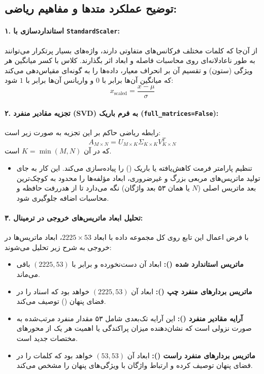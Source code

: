 \documentclass{article}
\begin{document}
    \subsection*{توضیح عملکرد متدها و مفاهیم ریاضی:}

    \paragraph{۱. استانداردسازی با \texttt{StandardScaler}:}\hspace{-10pt}
    از آن‌جا که کلمات مختلف فرکانس‌های متفاوتی دارند، واژه‌های بسیار پرتکرار می‌توانند به طور ناعادلانه‌ای روی محاسبات فاصله و ابعاد اثر بگذارند. کلاس  با کسر میانگین هر ویژگی (ستون) و تقسیم آن بر انحراف معیار، داده‌ها را به گونه‌ای مقیاس‌دهی می‌کند که میانگین آن‌ها برابر با $0$ و واریانس آن‌ها برابر با $1$ شود:
    $$x_{\text{scaled}} = \frac{x - \mu}{\sigma}$$

    \paragraph{۲. تجزیه مقادیر منفرد (SVD) به فرم باریک (\texttt{full\_matrices=False}):}\hspace{-10pt}
    رابطه ریاضی حاکم بر این تجزیه به صورت زیر است:
    $$A_{M \times N} = U_{M \times K} \Sigma_{K \times K} V^T_{K \times N}$$
    که در آن $K = \min(M, N)$ است. 
    \begin{itemize}
        \item تنظیم پارامتر  فرمت کاهش‌یافته یا باریک () را پیاده‌سازی می‌کند. این کار به جای تولید ماتریس‌های مربعی بزرگ و غیرضروری، ابعاد مؤلفه‌ها را محدود به کوچک‌ترین بعد ماتریس اصلی ($N$ یا همان ۵۳ بعد واژگان) نگه می‌دارد تا از هدررفت حافظه و محاسبات اضافه جلوگیری شود.
    \end{itemize}

    \paragraph{۳. تحلیل ابعاد ماتریس‌های خروجی در ترمینال:}\hspace{-10pt}
    با فرض اعمال این تابع روی کل مجموعه داده با ابعاد $2225 \times 53$، ابعاد ماتریس‌ها در خروجی به شرح زیر تحلیل می‌شوند:
    \begin{itemize}
        \item \textbf{ماتریس استاندارد شده ():} ابعاد آن دست‌نخورده و برابر با $(2225, 53)$ باقی می‌ماند.
        \item \textbf{ماتریس بردار‌های منفرد چپ ():} ابعاد آن $(2225, 53)$ خواهد بود که اسناد را در فضای پنهان () توصیف می‌کند.
        \item \textbf{آرایه مقادیر منفرد ():} این آرایه تک‌بعدی شامل ۵۳ مقدار منفرد مرتب‌شده به صورت نزولی است که نشان‌دهنده میزان پراکندگی یا اهمیت هر یک از محورهای مختصات جدید است.
        \item \textbf{ماتریس بردار‌های منفرد راست ():} ابعاد آن $(53, 53)$ خواهد بود که کلمات را در فضای پنهان توصیف کرده و ارتباط واژگان با ویژگی‌های پنهان را مشخص می‌کند.
    \end{itemize}
\end{document}
